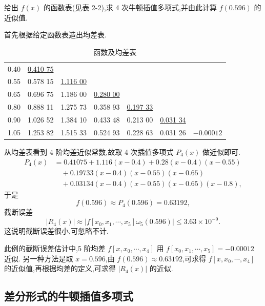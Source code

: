 \documentclass[../../main.tex]{subfiles}%
\begin{document}
\begin{example}
给出 $f(x)$ 的函数表(见表 2-2),求 4 次牛顿插值多项式,并由此计算 $f(0.596)$ 的近似值.
\end{example}
\begin{solution}

首先根据给定函数表造出均差表.
\begin{table}[H]
\centering
\caption{函数及均差表}
\label{table:例题1均差表}
\begin{tabular}{c|c|c|c|c|c|c}
\hline
0.40  & \underline{0.410 75} &          &          &          &          &          \\
0.55  & 0.578 15          & \underline{1.116 00} &          &          &          &          \\
0.65  & 0.696 75          & 1.186 00          & \underline{0.280 00} &          &          &          \\
0.80  & 0.888 11          & 1.275 73          & 0.358 93          & \underline{0.197 33} &          &          \\
0.90  & 1.026 52          & 1.384 10          & 0.433 48          & 0.213 00          & \underline{0.031 34} &          \\
1.05  & 1.253 82          & 1.515 33          & 0.524 93          & 0.228 63          & 0.031 26          & $-0.000 12$ \\
\hline
\end{tabular}
\end{table}
从均差表看到 4 阶均差近似常数,故取 4 次插值多项式 $P_4(x)$ 做近似即可.
\begin{align*}
P_4(x) &= 0.41075 + 1.116(x - 0.4) + 0.28(x - 0.4)(x - 0.55) \\
&\quad + 0.19733(x - 0.4)(x - 0.55)(x - 0.65) \\
&\quad + 0.03134(x - 0.4)(x - 0.55)(x - 0.65)(x - 0.8),
\end{align*}
于是
\[
f(0.596) \approx P_4(0.596) = 0.63192,
\]
截断误差
\[
|R_4(x)| \approx |f[x_0, x_1, \cdots, x_5]\omega_5(0.596)| \leqslant 3.63 \times 10^{-9}.
\]
这说明截断误差很小,可忽略不计.

此例的截断误差估计中,5 阶均差 $f[x, x_0, \cdots, x_4]$ 用 $f[x_0, x_1, \cdots, x_5] = -0.00012$ 近似. 另一种方法是取 $x = 0.596$,由 $f(0.596) \approx 0.63192$,可求得 $f[x, x_0, \cdots, x_4]$ 的近似值,再根据均差的定义,可求得 $|R_4(x)|$ 的近似.

\end{solution}


\subsection{差分形式的牛顿插值多项式}
\end{document}
